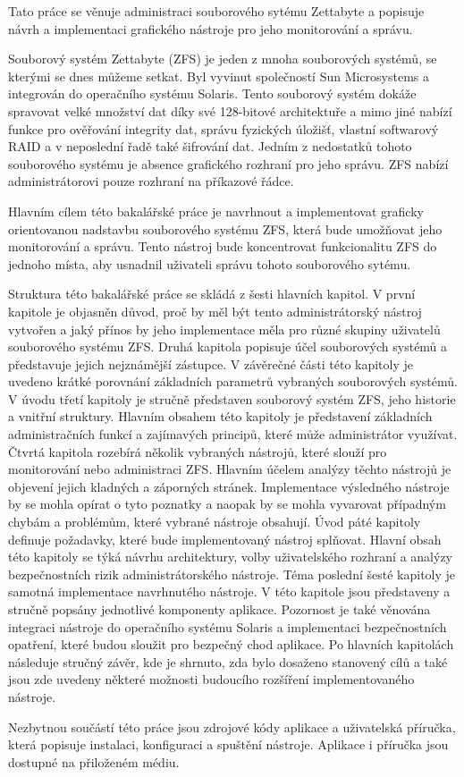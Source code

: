 Tato práce se věnuje administraci souborového sytému Zettabyte a popisuje návrh a implementaci grafického nástroje pro jeho monitorování a správu.

Souborový systém Zettabyte (ZFS) je jeden z mnoha souborových systémů, se kterými se dnes můžeme setkat.
Byl vyvinut společností Sun Microsystems a integrován do operačního systému Solaris. Tento souborový systém dokáže spravovat velké množství dat díky své 128-bitové architektuře a mimo jiné nabízí funkce pro ověřování integrity dat, správu fyzických úložišť, vlastní softwarový RAID a v neposlední
řadě také šifrování dat. Jedním z nedostatků tohoto souborového systému je absence grafického rozhraní pro jeho správu. ZFS nabízí administrátorovi pouze rozhraní na příkazové řádce.

Hlavním cílem této bakalářské práce je navrhnout a implementovat graficky orientovanou nadstavbu souborového systému ZFS, která bude umožňovat jeho monitorování a správu. Tento nástroj bude koncentrovat funkcionalitu ZFS do jednoho místa, aby usnadnil uživateli správu tohoto souborového sytému.

Struktura této bakalářské práce se skládá z šesti hlavních kapitol.
V první kapitole je objasněn důvod, proč by měl být tento administrátorský nástroj vytvořen a jaký přínos by jeho implementace měla pro různé skupiny uživatelů souborového systému ZFS.
Druhá kapitola popisuje účel souborových systémů a představuje jejich nejznámější zástupce. V závěrečné části této kapitoly je uvedeno krátké porovnání základních parametrů vybraných souborových systémů.
V úvodu třetí kapitoly je stručně představen souborový systém ZFS, jeho historie a vnitřní struktury. Hlavním obsahem této kapitoly je představení základních administračních funkcí a zajímavých principů, které může administrátor využívat.
Čtvrtá kapitola rozebírá několik vybraných nástrojů, které slouží pro monitorování nebo administraci ZFS. Hlavním účelem analýzy těchto nástrojů je objevení jejich kladných a záporných stránek. Implementace výsledného nástroje by se mohla opírat o tyto poznatky a naopak by se mohla vyvarovat případným chybám a problémům, které vybrané nástroje obsahují.
Úvod páté kapitoly definuje požadavky, které bude implementovaný nástroj splňovat. Hlavní obsah této kapitoly se týká návrhu architektury, volby uživatelského rozhraní a analýzy bezpečnostních rizik administrátorského nástroje.
Téma poslední šesté kapitoly je samotná implementace navrhnutého nástroje. V této kapitole jsou představeny a stručně popsány jednotlivé komponenty aplikace. Pozornost je také věnována integraci nástroje do operačního systému Solaris a implementaci bezpečnostních opatření, které budou sloužit pro bezpečný chod aplikace.
Po hlavních kapitolách následuje stručný závěr, kde je shrnuto, zda bylo dosaženo stanovený cílů a také jsou zde uvedeny některé možnosti budoucího rozšíření implementovaného nástroje.

Nezbytnou součástí této práce jsou zdrojové kódy aplikace a uživatelská příručka, která popisuje instalaci, konfiguraci a spuštění nástroje. Aplikace i příručka jsou dostupné na přiloženém médiu.



